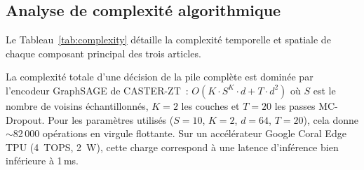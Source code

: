 \subsection{Analyse de complexité algorithmique}

Le Tableau~\ref{tab:complexity} détaille la complexité temporelle et spatiale de chaque composant principal des trois articles.

\begin{table}[htbp]
\centering
\caption{Analyse de complexité algorithmique des composants principaux. $n$~: n\oe{}uds, $|E|$~: arêtes, $d$~: dimension des plongements, $K$~: couches GNN, $T$~: passes MC-Dropout.}
\label{tab:complexity}
\end{table}

\noindent La complexité totale d'une décision de la pile complète est dominée par l'encodeur GraphSAGE de CASTER-ZT~: $O(K \cdot S^K \cdot d + T \cdot d^2)$ où $S$ est le nombre de voisins échantillonnés, $K = 2$ les couches et $T = 20$ les passes MC-Dropout. Pour les paramètres utilisés ($S = 10$, $K = 2$, $d = 64$, $T = 20$), cela donne $\sim$82\,000 opérations en virgule flottante. Sur un accélérateur Google Coral Edge TPU (4~TOPS, 2~W), cette charge correspond à une latence d'inférence bien inférieure à 1\,ms.


